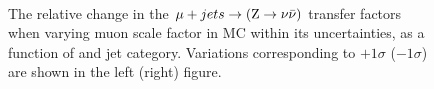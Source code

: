 \begin{figure}[!h]
  \centering
   ~~
  \\

  \caption{\label{fig:tfSyst_muon scale factor_muToZinv} The relative change in
  the $\mu + jets \rightarrow ({\text Z} \rightarrow \nu\bar{\nu})$ transfer
  factors when varying muon scale factor in MC within its uncertainties, as a function of \scalht and jet category. 
  Variations corresponding to $+1\sigma$ ($-1\sigma$) are shown in the left (right) figure. 
  }
\end{figure}
